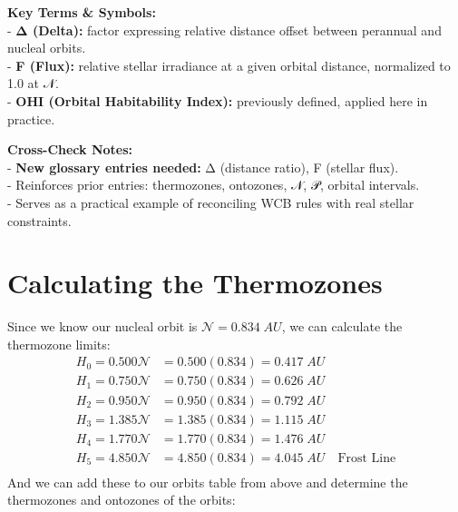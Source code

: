 \documentclass[
  letterpaper,
]{book}
\begin{document}
\textbf{Key Terms \& Symbols:}\\
- \textbf{Δ (Delta):} factor expressing relative distance offset between
perannual and nucleal orbits.\\
- \textbf{F (Flux):} relative stellar irradiance at a given orbital
distance, normalized to 1.0 at 𝒩.\\
- \textbf{OHI (Orbital Habitability Index):} previously defined, applied
here in practice.

\textbf{Cross-Check Notes:}\\
- \textbf{New glossary entries needed:} Δ (distance ratio), F (stellar
flux).\\
- Reinforces prior entries: thermozones, ontozones, 𝒩, 𝒫, orbital
intervals.\\
- Serves as a practical example of reconciling WCB rules with real
stellar constraints.

\chapter{Calculating the Thermozones}\label{calculating-the-thermozones}

Since we know our nucleal orbit is \(\mathcal{N} = 0.834\;AU\), we can
calculate the thermozone limits: \[
\begin{align}
H_0 = 0.500\mathcal{N} &= 0.500(0.834) = 0.417\;AU \\
H_1 = 0.750\mathcal{N} &= 0.750(0.834) = 0.626\;AU \\
H_2 = 0.950\mathcal{N} &= 0.950(0.834) = 0.792\;AU \\
H_3 = 1.385\mathcal{N} &= 1.385(0.834) = 1.115\;AU \\
H_4 = 1.770\mathcal{N} &= 1.770(0.834) = 1.476\;AU \\
H_5 = 4.850\mathcal{N} &= 4.850(0.834) = 4.045\;AU \quad \text{Frost Line} \\
\end{align}
\] And we can add these to our orbits table from above and determine the
thermozones and ontozones of the orbits:
\end{document}
